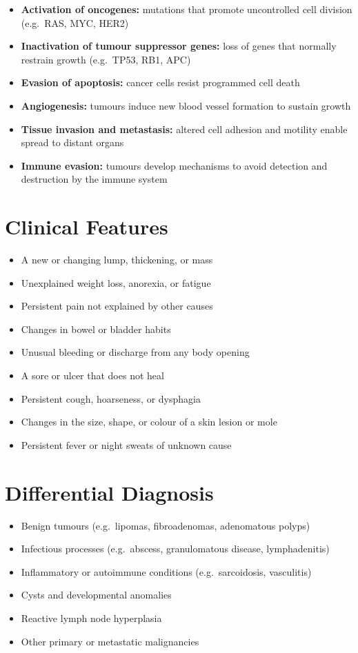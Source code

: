 \begin{itemize}
    \item \textbf{Activation of oncogenes:} mutations that promote uncontrolled cell division (e.g.\ RAS, MYC, HER2)
    \item \textbf{Inactivation of tumour suppressor genes:} loss of genes that normally restrain growth (e.g.\ TP53, RB1, APC)
    \item \textbf{Evasion of apoptosis:} cancer cells resist programmed cell death
    \item \textbf{Angiogenesis:} tumours induce new blood vessel formation to sustain growth
    \item \textbf{Tissue invasion and metastasis:} altered cell adhesion and motility enable spread to distant organs
    \item \textbf{Immune evasion:} tumours develop mechanisms to avoid detection and destruction by the immune system
\end{itemize}

\section*{Clinical Features}
\begin{itemize}
    \item A new or changing lump, thickening, or mass
    \item Unexplained weight loss, anorexia, or fatigue
    \item Persistent pain not explained by other causes
    \item Changes in bowel or bladder habits
    \item Unusual bleeding or discharge from any body opening
    \item A sore or ulcer that does not heal
    \item Persistent cough, hoarseness, or dysphagia
    \item Changes in the size, shape, or colour of a skin lesion or mole
    \item Persistent fever or night sweats of unknown cause
\end{itemize}

\section*{Differential Diagnosis}
\begin{itemize}
    \item Benign tumours (e.g.\ lipomas, fibroadenomas, adenomatous polyps)
    \item Infectious processes (e.g.\ abscess, granulomatous disease, lymphadenitis)
    \item Inflammatory or autoimmune conditions (e.g.\ sarcoidosis, vasculitis)
    \item Cysts and developmental anomalies
    \item Reactive lymph node hyperplasia
    \item Other primary or metastatic malignancies
\end{itemize}

